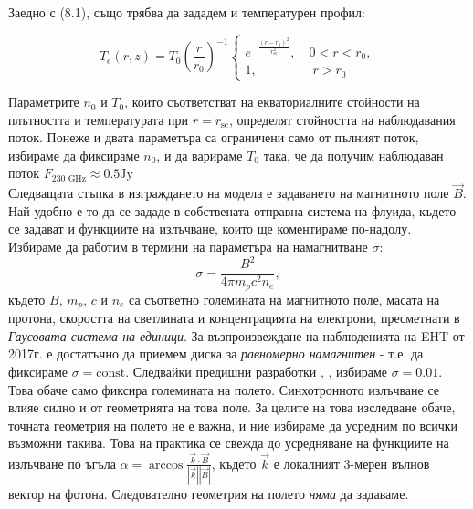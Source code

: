 Заедно с (8.1), също трябва да зададем и температурен профил:

\begin{equation}
	T_e(r,z) = T_0\left(\frac{r}{r_0}\right)^{-1}
	\begin{cases}
		e^{-\frac{(r-r_0)^2}{r^2_{\text{sc}}}},\quad 0 < r < r_0,\\
		1,\,\,\qquad\qquad r>r_0
	\end{cases}
\end{equation}

Параметрите $n_0$ и $T_0$, които съответстват на екваториалните стойности на плътността и температурата при $r = r_\text{sc}$, определят стойността на наблюдавания поток. Понеже и двата параметъра са ограничени само от пълният поток, избираме да фиксираме $n_0$, и да варираме $T_0$ така, че да получим наблюдаван поток $F_{\text{230 GHz}} \approx 0.5 \text{Jy}$\\

Следващата стъпка в изграждането на модела е задаването на магнитното поле $\vec{B}$. Най-удобно е то да се зададе в собствената отправна система на флуида, където се задават и функциите на излъчване, които ще коментираме по-надолу. Избираме да работим в термини на параметъра на намагнитване $\sigma$:
\begin{equation}
	\sigma = \frac{B^2}{4\pi m_pc^2n_e},
\end{equation}
където $B$, $m_p$, $c$ и $n_e$ са съответно големината на магнитното поле, масата на протона, скоростта на светлината и концентрацията на електрони, пресметнати в \emph{Гаусовата система на единици}. За възпроизвеждане на наблюденията на EHT от 2017г. е достатъчно да приемем диска за \emph{равномерно намагнитен} - т.е. да фиксираме $\sigma = \text{const}$. Следвайки предишни разработки \cite{KERR_SIM_PAPER}, \cite{Geometric_Modeling}, избираме $\sigma = 0.01$. Това обаче само фиксира големината на полето. Синхотронното излъчване се влияе силно и от геометрията на това поле. За целите на това изследване обаче, точната геометрия на полето не е важна, и ние избираме да усредним по всички възможни такива. Това на практика се свежда до усредняване на функциите на излъчване по ъгъла $\alpha = \arccos\frac{\vec{k}\cdot\vec{B}}{|\vec{k}||\vec{B}|}$, където $\vec{k}$ е локалният 3-мерен вълнов вектор на фотона. Следователно геометрия на полето \emph{няма} да задаваме.\\

